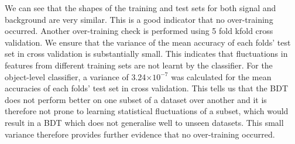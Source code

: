 We can see that the shapes of the training and test sets for both signal and background are very similar. This is a good indicator that no over-training occurred. Another over-training check is performed using 5 fold kfold cross validation. We ensure that the variance of the mean accuracy of each folds' test set in cross validation is substantially small. This indicates that fluctuations in features from different training sets are not learnt by the classifier. For the object-level classifier, a variance of 3.24$\times 10^{-7}$ was calculated for the mean accuracies of each folds' test set in cross validation. This tells us that the BDT does not perform better on one subset of a dataset over another and it is therefore not prone to learning statistical fluctuations of a subset, which would result in a BDT which does not generalise well to unseen datasets. This small variance therefore provides further evidence that no over-training occurred.\\

